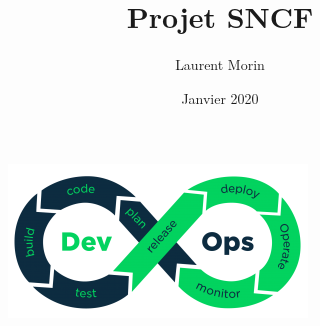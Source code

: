 \documentclass[a4paper, 11pt]{scrartcl}
\begin{document}
\date{Janvier 2020}
\author{Laurent Morin}
\title{Projet SNCF}

\maketitle
\begin{figure}[h]
  \center 
   \includegraphics[]{devops.png}
\end{figure}











\end{document}

